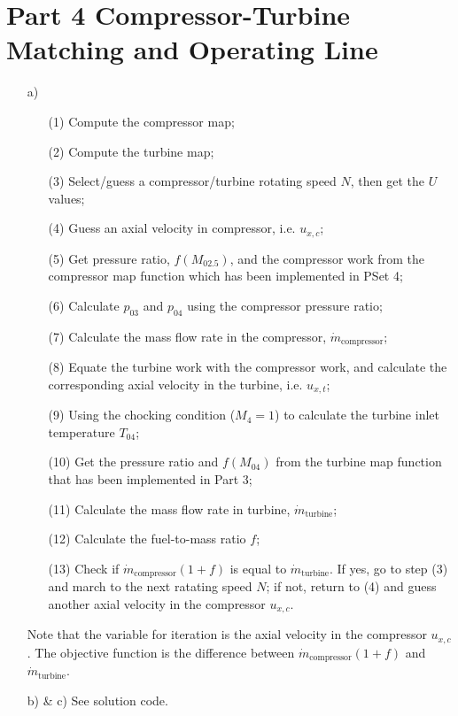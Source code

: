 \documentclass[12pt]{article}
\begin{document}
\section{Part 4 Compressor-Turbine Matching and Operating Line}		
\begin{itemize}
	\item[a)]
		\begin{itemize}
			\item[(1)] Compute the compressor map;
			\item[(2)] Compute the turbine map;
			\item[(3)] Select/guess a compressor/turbine rotating speed $N$, then get the $U$ values;
			\item[(4)] Guess an axial velocity in compressor, i.e. $u_{x,c}$;
			\item[(5)] Get pressure ratio, $f(M_{02.5})$, and the compressor work from the compressor map function which has been implemented in PSet 4;
			\item[(6)] Calculate $p_{03}$ and $p_{04}$ using the compressor pressure ratio;
			\item[(7)] Calculate the mass flow rate in the compressor, $\dot{m}_\text{compressor}$;
			\item[(8)] Equate the turbine work with the compressor work, and calculate the corresponding axial velocity in the turbine, i.e. $u_{x,t}$;
			\item[(9)] Using the chocking condition ($M_4 = 1$) to calculate the turbine inlet temperature $T_{04}$;
			\item[(10)] Get the pressure ratio and $f(M_{04})$ from the turbine map function that has been implemented in Part 3;
			\item[(11)] Calculate the mass flow rate in turbine, $\dot{m}_\text{turbine}$;
			\item[(12)] Calculate the fuel-to-mass ratio $f$;
			\item[(13)] Check if $\dot{m}_\text{compressor}(1+f)$ is equal to $\dot{m}_\text{turbine}$. If yes, go to step (3) and march to the next ratating speed $N$; if not, return to (4) and guess another axial velocity in the compressor $u_{x,c}$.
		\end{itemize}
		Note that the variable for iteration is the axial velocity in the compressor $u_{x,c}$. The objective function is the difference between $\dot{m}_\text{compressor}(1+f)$ and $\dot{m}_\text{turbine}$.
	\item[b) \& c)]
	See solution code.
		

\end{itemize}
\end{document}
